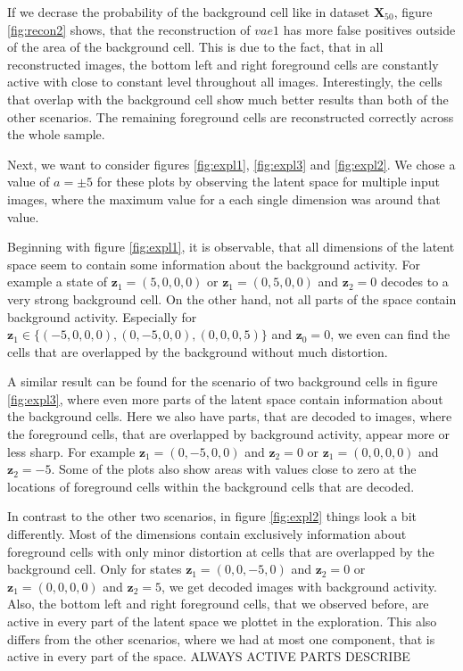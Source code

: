 \documentclass[12pt]{report}
\theoremstyle{definition}
\begin{document}
If we decrase the probability of the background cell like in dataset $\mathbf{X}_{50}$, figure \ref{fig:recon2} shows, that the reconstruction of $vae1$ has more false positives outside of the area of the background cell. This is due to the fact, that in all reconstructed images, the bottom left and right foreground cells are constantly active with close to constant level throughout all images. Interestingly, the cells that overlap with the background cell show much better results than both of the other scenarios. The remaining foreground cells are reconstructed correctly across the whole sample.

Next, we want to consider figures \ref{fig:expl1}, \ref{fig:expl3} and \ref{fig:expl2}. We chose a value of $a = \pm 5$ for these plots by observing the latent space for multiple input images, where the maximum value for a each single dimension was around that value.

Beginning with figure \ref{fig:expl1}, it is observable, that all dimensions of the latent space seem to contain some information about the background activity. For example a state of $\mathbf{z}_1 = (5, 0, 0, 0)$ or $\mathbf{z}_1 = (0, 5, 0, 0)$ and $\mathbf{z}_2 = 0$ decodes to a very strong background cell. On the other hand, not all parts of the space contain background activity. Especially for $\mathbf{z}_1 \in \{(-5, 0, 0, 0), (0, -5, 0, 0), (0, 0, 0, 5)\}$ and $\mathbf{z}_0 = 0$, we even can find the cells that are overlapped by the background without much distortion. 

A similar result can be found for the scenario of two background cells in figure \ref{fig:expl3}, where even more parts of the latent space contain information about the background cells. Here we also have parts, that are decoded to images, where the foreground cells, that are overlapped by background activity, appear more or less sharp. For example $\mathbf{z}_1 = (0, -5, 0, 0)$ and $\mathbf{z}_2=0$ or $\mathbf{z}_1 = (0, 0, 0, 0)$ and $\mathbf{z}_2 = -5$. Some of the plots also show areas with values close to zero at the locations of foreground cells within the background cells that are decoded.

In contrast to the other two scenarios, in figure \ref{fig:expl2} things look a bit differently. Most of the dimensions contain exclusively information about foreground cells with only minor distortion at cells that are overlapped by the background cell. Only for states $\mathbf{z}_1 = (0, 0, -5, 0)$ and $\mathbf{z}_2=0$ or $\mathbf{z}_1 = (0, 0, 0, 0)$ and $\mathbf{z}_2 = 5$, we get decoded images with background activity. Also, the bottom left and right foreground cells, that we observed before, are active in every part of the latent space we plottet in the exploration. This also differs from the other scenarios, where we had at most one component, that is active in every part of the space. ALWAYS ACTIVE PARTS DESCRIBE
\end{document}
